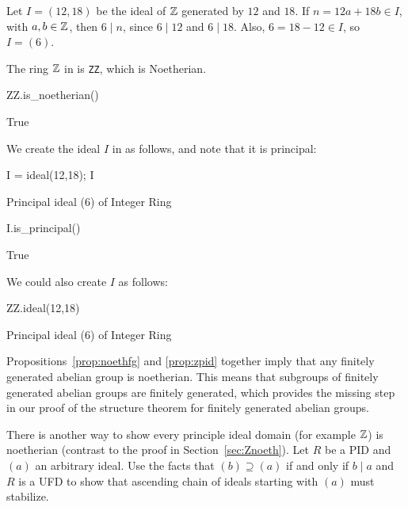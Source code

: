 \begin{example}
Let $I=(12,18)$ be the ideal of $\mathbb{Z}$ generated by $12$ and $18$.
If $n=12a+18b\in I$, with $a,b\in\mathbb{Z}$,
then $6\mid n$, since $6\mid 12$ and $6\mid 18$.
Also, $6=18-12\in I$, so $I=(6)$.

The ring $\mathbb{Z}$
in \sage{} is {\tt ZZ}, which is Noetherian.
\begin{sagecode}
\begin{sagecell}
ZZ.is_noetherian()
\end{sagecell}
\begin{sageout}
True
\end{sageout}
\end{sagecode}
We create the ideal $I$ in \sage{} as follows, and note that
it is principal:
\begin{sagecode}
\begin{sagecell}
I = ideal(12,18); I
\end{sagecell}
\begin{sageout}
Principal ideal (6) of Integer Ring
\end{sageout}
\begin{sagecell}
I.is_principal()
\end{sagecell}
\begin{sageout}
True
\end{sageout}
\end{sagecode}
We could also create $I$ as follows:
\begin{sagecode}
\begin{sagecell}
ZZ.ideal(12,18)
\end{sagecell}
\begin{sageout}
Principal ideal (6) of Integer Ring
\end{sageout}
\end{sagecode}
\end{example}

Propositions~\ref{prop:noethfg} and \ref{prop:zpid} together imply that
any finitely generated abelian group is noetherian.  This means that
subgroups of finitely generated abelian groups are finitely generated,
which provides the missing step in our proof of the structure theorem
for finitely generated abelian groups.

\begin{exercise}
	There is another way to show every principle ideal domain (for example $\mathbb{Z}$) is noetherian (contrast to the proof in Section~\ref{sec:Znoeth}). Let $R$ be a PID and $(a)$ an arbitrary ideal. Use the facts that $(b)\supseteq(a)$ if and only if $b \mid a$ and $R$ is a UFD to show that ascending chain of ideals starting with $(a)$ must stabilize.
\end{exercise}

